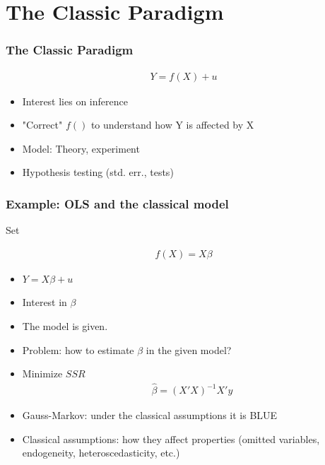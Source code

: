 \documentclass[
  shownotes,
  xcolor={svgnames},
  hyperref={colorlinks,citecolor=DarkBlue,linkcolor=DarkRed,urlcolor=DarkBlue}
  ]{beamer}
\begin{document}
\section{The Classic Paradigm}
\begin{frame}
\frametitle{The Classic Paradigm}


\begin{align}
Y=f(X)+u
\end{align}
\medskip
\begin{itemize}
  \item Interest lies on inference 
  \medskip
  \item "Correct" $f()$ to understand how Y is affected by X
  \medskip
  \item Model: Theory, experiment
  \medskip
  \item Hypothesis testing (std. err., tests)
\end{itemize}

\end{frame}

\begin{frame}
\frametitle{Example: OLS and the classical model}

Set 

\begin{align}
f(X)=X\beta
\end{align}

\begin{itemize}
    \item $Y=X\beta+u$ 
    \item Interest in $\beta$

    \item The model is given. 
    \item Problem: how to estimate $\beta$ in the given model?
    \item Minimize $SSR$
      \begin{align}
          \hat \beta= (X'X)^{-1} X'y
      \end{align}


    \item Gauss-Markov: under the classical assumptions it is BLUE

    \item Classical assumptions: how they affect properties (omitted variables, endogeneity, heteroscedasticity, etc.)
\end{itemize}

\end{frame}
\end{document}
